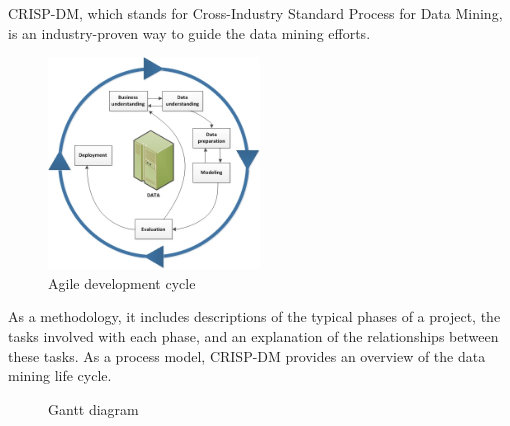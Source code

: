 CRISP-DM, which stands for Cross-Industry Standard Process for Data Mining, is an industry-proven way to guide the data mining efforts.

\begin{figure}[h]
	\centering
	\includegraphics[width=0.5\textwidth]{Figures/CRISP_DM.jpg}
	\caption{Agile development cycle}
\end{figure}
\FloatBarrier

As a methodology, it includes descriptions of the typical phases of a project, the tasks involved with each phase, and an explanation of the relationships between these tasks.
As a process model, CRISP-DM provides an overview of the data mining life cycle.
\thispagestyle{empty}

\begin{landscape}
	
\begin{figure}
	\noindent
					\vspace*{-2cm}
	\hspace{4.35cm}

	\caption{Gantt diagram}

\end{figure}

\end{landscape}
\restoregeometry